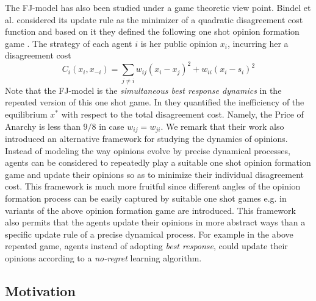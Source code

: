 The FJ-model has also been studied under a game theoretic
view point. Bindel et al. considered its update rule
as the minimizer of a quadratic disagreement cost function
and based on it they defined the following one shot
opinion formation game \cite{BKO11}. The strategy of each agent $i$ is
her public opinion $x_i$, incurring her a
disagreement cost
%
\begin{equation}\label{eq:BKO_cost}
  C_i(x_i,x_{-i})=
  \sum_{j \neq i}w_{ij} (x_i-x_j)^2 + w_{ii}(x_i-s_i)^2
\end{equation}
%
Note that the FJ-model is the \emph{simultaneous best response dynamics}
in the repeated version of this one shot game. In \cite{BKO11}
they quantified the inefficiency of the equilibrium $x^*$ with
respect to the total disagreement cost. Namely, the Price of Anarchy
is less than $9/8$ in case $w_{ij}=w_{ji}$.
We remark that their work also introduced an alternative
framework for studying the dynamics of opinions.
Instead of modeling the way opinions evolve
by precise dynamical processes, agents can be considered to repeatedly
play a suitable one shot opinion formation game and update their
opinions so as to minimize their individual disagreement cost.
This framework is much more fruitful since
different angles of the opinion formation process can be easily
captured by suitable one shot games e.g. in \cite{BGM13,EFHS17}
variants of the above opinion formation game are introduced.
This framework also permits that the agents
update their opinions in more abstract ways than
a specific update rule of a precise dynamical process.
For example in the above repeated game, agents instead of
adopting \emph{best response}, could update their opinions according
to a \emph{no-regret} learning algorithm.

\subsection{Motivation}

